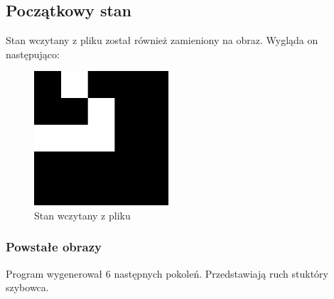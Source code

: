 \documentclass{mwart}
\begin{document}
\subsection{Początkowy stan}
Stan wczytany z pliku został również zamieniony na obraz. Wygląda on następująco:
\begin{figure}[H]
  \setlength{\fboxsep}{0pt} %
  \setlength{\fboxrule}{1pt}
  \centering

  \includegraphics[width = 5cm]{glider0}
  \caption{Stan wczytany z pliku}
\end{figure}

\newpage{}
\subsubsection{Powstałe obrazy}
Program wygenerował 6 następnych pokoleń. Przedstawiają ruch stuktóry szybowca.
\end{document}
